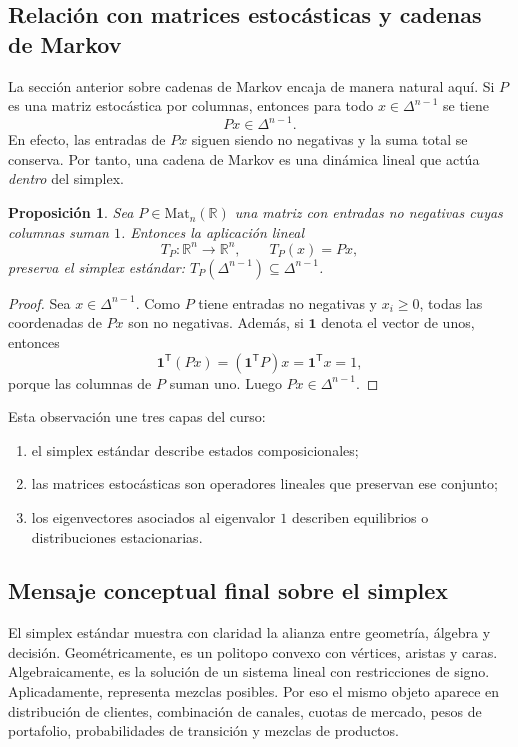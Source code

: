 \documentclass[10pt,a4paper,oneside]{article}
\theoremstyle{plain}
\newtheorem{proposition}[theorem]{Proposición}
\theoremstyle{definition}
\theoremstyle{remark}
\newcommand{\R}{\mathbb{R}}
\newcommand{\Mat}{\mathrm{Mat}}
\begin{document}
\subsection{Relación con matrices estocásticas y cadenas de Markov}

La sección anterior sobre cadenas de Markov encaja de manera natural aquí. Si $P$ es una matriz estocástica por columnas, entonces para todo $x\in\Delta^{n-1}$ se tiene
\[
Px\in\Delta^{n-1}.
\]
En efecto, las entradas de $Px$ siguen siendo no negativas y la suma total se conserva. Por tanto, una cadena de Markov es una dinámica lineal que actúa \emph{dentro} del simplex.

\begin{proposition}
Sea $P\in\Mat_n(\R)$ una matriz con entradas no negativas cuyas columnas suman $1$. Entonces la aplicación lineal
\[
T_P:\R^n\to\R^n,
\qquad
T_P(x)=Px,
\]
preserva el simplex estándar: $T_P(\Delta^{n-1})\subseteq \Delta^{n-1}$.
\end{proposition}

\begin{proof}
Sea $x\in\Delta^{n-1}$. Como $P$ tiene entradas no negativas y $x_i\ge 0$, todas las coordenadas de $Px$ son no negativas. Además, si $\mathbf{1}$ denota el vector de unos, entonces
\[
\mathbf{1}^{\mathsf T}(Px)=(\mathbf{1}^{\mathsf T}P)x=\mathbf{1}^{\mathsf T}x=1,
\]
porque las columnas de $P$ suman uno. Luego $Px\in\Delta^{n-1}$.
\end{proof}

\begin{methodBox}
Esta observación une tres capas del curso:
\begin{enumerate}[label=\textup{(\arabic*)}]
\item el simplex estándar describe estados composicionales;
\item las matrices estocásticas son operadores lineales que preservan ese conjunto;
\item los eigenvectores asociados al eigenvalor $1$ describen equilibrios o distribuciones estacionarias.
\end{enumerate}
\end{methodBox}

\subsection{Mensaje conceptual final sobre el simplex}

El simplex estándar muestra con claridad la alianza entre geometría, álgebra y decisión. Geométricamente, es un politopo convexo con vértices, aristas y caras. Algebraicamente, es la solución de un sistema lineal con restricciones de signo. Aplicadamente, representa mezclas posibles. Por eso el mismo objeto aparece en distribución de clientes, combinación de canales, cuotas de mercado, pesos de portafolio, probabilidades de transición y mezclas de productos.
\end{document}

